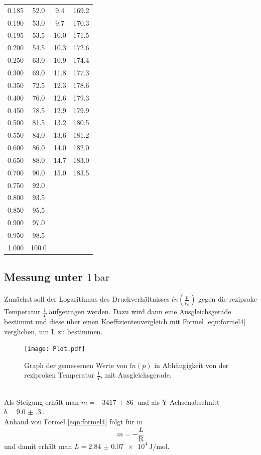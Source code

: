 \documentclass[
  bibliography=totoc,     %
  captions=tableheading,  %
  titlepage=firstiscover, %
]{scrartcl}
\begin{document}
\begin{table}
\begin{tabular}{S[table-format=1.3] S S[table-format=2.1] S}
    0.185 & 52.0 & 9.4 & 169.2\\
    0.190 & 53.0 & 9.7 & 170.3\\
    0.195 & 53.5 & 10.0 & 171.5\\
    0.200 & 54.5 & 10.3 & 172.6\\
    0.250 & 63.0 & 10.9 & 174.4\\
    0.300 & 69.0 & 11.8 & 177.3\\
    0.350 & 72.5 & 12.3 & 178.6\\
    0.400 & 76.0 & 12.6 & 179.3\\
    0.450 & 78.5 & 12.9 & 179.9\\
    0.500 & 81.5 & 13.2 & 180.5\\
    0.550 & 84.0 & 13.6 & 181.2\\
    0.600 & 86.0 & 14.0 & 182.0\\
    0.650 & 88.0 & 14.7 & 183.0\\
    0.700 & 90.0 & 15.0 & 183.5\\
    0.750 & 92.0 &  & \\
    0.800 & 93.5 &  & \\
    0.850 & 95.5 &  & \\
    0.900 & 97.0 &  & \\
    0.950 & 98.5 &  & \\
    1.000 & 100.0 &  & \\
    \bottomrule
  \end{tabular}
\end{table}
\clearpage
\subsection{Messung unter $\SI{1}{\bar}$}
Zunächst soll der Logarithmus des Druckverhältnisses $ln \left( \frac{p}{p_0} \right)$ gegen die reziproke Temperatur $\frac{1}{T}$
aufgetragen werden. Dazu wird dann eine Ausgleichsgerade bestimmt und diese über einen Koeffizientenvergleich mit Formel \eqref{eqn:formel4}
verglichen, um L zu bestimmen.
\begin{figure}
  \centering
  \texttt{[image: Plot.pdf]}
  \caption{Graph der gemessenen Werte von $ln \left( p \right)$ in Abhängigkeit von der reziproken
  Temperatur $\frac{1}{T}$, mit Ausgleichsgerade.}
  \label{fig:plot1}
\end{figure}\\
Als Steigung erhält man $m = \SI{-3417(86)}{}$ und als Y-Achsenabschnitt $b = \SI{9.0(3)}{}$.\\
Anhand von Formel \eqref{eqn:formel4} folgt für m
\begin{equation}
  m = -\frac{L}{\mathup{R}}
\end{equation}
und damit erhält man $L = \SI{2.84(7)e4}{\joule\per\mol}$.\\
\end{document}
